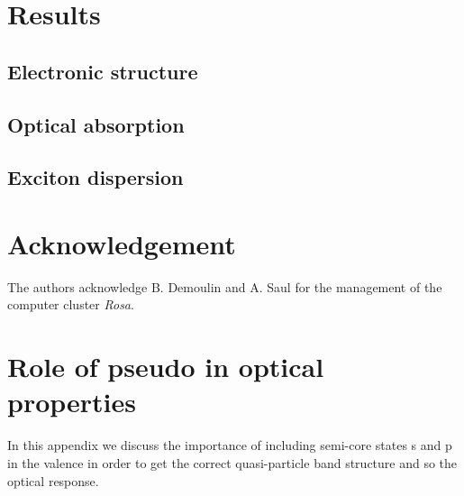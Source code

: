 \documentclass[twocolumn,showpacs,prb,superscriptaddress,aps,floatfix]{revtex4-1}
\begin{document}
\section{Results}
\subsection{Electronic structure}
\subsection{Optical absorption}
\subsection{Exciton dispersion}
\section{\label{ackn}Acknowledgement}
The authors acknowledge B. Demoulin and  A. Saul for the management of the computer cluster \emph{Rosa}. 
\appendix
\section{Role of pseudo in optical properties}
In this appendix we discuss the importance of including semi-core states s and p in the valence in order to get the correct quasi-particle band structure and so the optical response.

\end{document}
